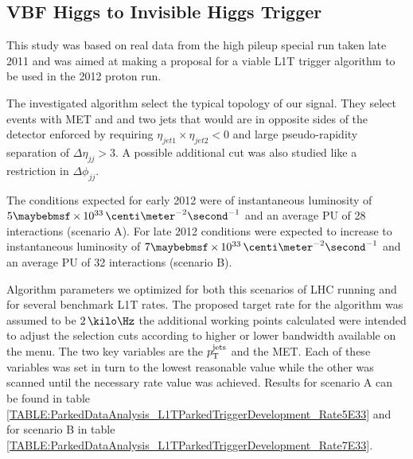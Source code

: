 \subsection{VBF Higgs to Invisible Higgs Trigger}
\label{SUBSECTION:ParkedDataAnalysis_ParkedTriggerDevelopment_VBFHiggsInvisibleTrigger}

This study was based on real data from the high pileup special run taken late 2011 and was aimed at making a proposal for a viable \gls{L1T} trigger algorithm to be used in the 2012 proton run. 

The investigated algorithm select the typical topology of our signal. They select events with \gls{MET} and and two jets that would are in opposite sides of the detector enforced by requiring $\eta_{jet1}\times\eta_{jet2}<0$ and large pseudo-rapidity separation of $\Delta\eta_{jj}>3$. A possible additional cut was also studied like a restriction in $\Delta\phi_{jj}$.

The conditions expected for early 2012 were of instantaneous luminosity of $5 \times 10^{33}\,\centi\meter^{-2}\second^{-1}$ and an average \gls{PU} of 28 interactions (scenario A). For late 2012 conditions were expected to increase to instantaneous luminosity of $7 \times 10^{33}\,\centi\meter^{-2}\second^{-1}$ and an average \gls{PU} of 32 interactions (scenario B).

Algorithm parameters we optimized for both this scenarios of \gls{LHC} running and for several benchmark \gls{L1T} rates. The proposed target rate for the algorithm was assumed to be $2\,\kilo\Hz$ the additional working points calculated were intended to adjust the selection cuts according to higher or lower bandwidth available on the menu. The two key variables are the $p_{\mathrm{T}}^{\text{jets}}$ and the \gls{MET}. Each of these variables was set in turn to the lowest reasonable value while the other was scanned until the necessary rate value was achieved.  Results for scenario A can be found in table \ref{TABLE:ParkedDataAnalysis_L1TParkedTriggerDevelopment_Rate5E33} and for scenario B in table \ref{TABLE:ParkedDataAnalysis_L1TParkedTriggerDevelopment_Rate7E33}.

